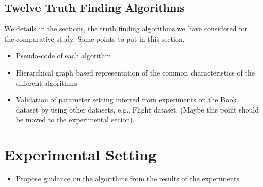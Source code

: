 \documentclass{vldb}
\begin{document}
\subsection{Twelve Truth Finding Algorithms}
We details in the sections, the truth finding 
algorithms we have considered for the comparative study.
Some points to put in this section.
\begin{itemize}
 \item Pseudo-code of each algorithm
 \item Hierarchical graph based representation of the common characteristics
 of the different algorithms
 \item Validation of parameter setting inferred from experiments on the Book
 dataset by using other datasets, e.g., Flight dataset. (Maybe this point should
 be moved to the experimental secion).
\end{itemize}

\section{Experimental Setting}

\begin{itemize}
 \item Propose guidance  on the algorithms from the results of the experiments
\end{itemize}
\end{document}
